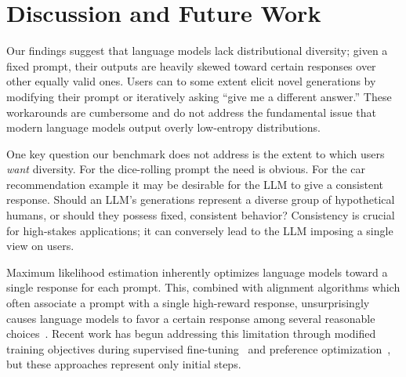 
\section{Discussion and Future Work}
\label{sec-discussion}
Our findings suggest that language models lack distributional diversity; given a fixed prompt, their outputs are heavily skewed toward certain responses over other equally valid ones.
Users can to some extent elicit novel generations by modifying their prompt or iteratively asking ``give me a different answer.''
These workarounds are cumbersome and do not address the fundamental issue that modern language models output overly low-entropy distributions.

One key question our benchmark does not address is the extent to which users \emph{want} diversity.
For the dice-rolling prompt the need is obvious.
For the car recommendation example it may be desirable for the LLM to give a consistent response.
Should an LLM's generations represent a diverse group of hypothetical humans, or should they possess fixed, consistent behavior?
Consistency is crucial for high-stakes applications; it can conversely lead to the LLM imposing a single view on users.


Maximum likelihood estimation inherently optimizes language models toward a single response for each prompt.
This, combined with alignment algorithms which often associate a prompt with a single high-reward response, unsurprisingly causes language models to favor a certain response among several reasonable choices~\cite{zhang2024diverging}.
Recent work has begun addressing this limitation through modified training objectives during supervised fine-tuning~\cite{li2024preserving} and preference optimization~\cite{lanchantin2025}, but these approaches represent only initial steps.

